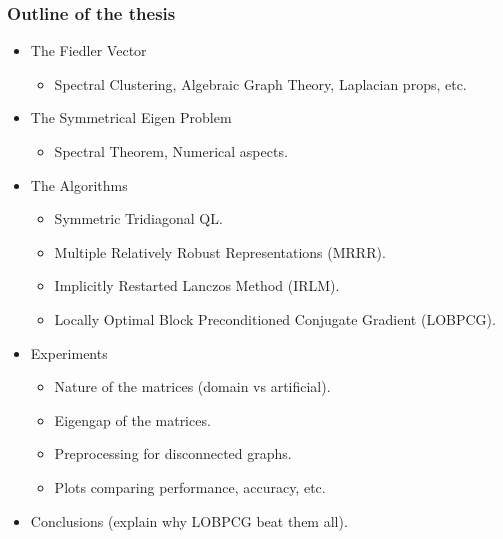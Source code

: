 \begin{frame}
  \frametitle{Outline of the thesis}
  \begin{itemize}
  \item The Fiedler Vector
    \begin{itemize}
    \item Spectral Clustering, Algebraic Graph Theory, Laplacian props, etc.
    \end{itemize}    
  \item The Symmetrical Eigen Problem
    \begin{itemize}
    \item Spectral Theorem, Numerical aspects.
    \end{itemize}    
  \item The Algorithms
    \begin{itemize}
    \item Symmetric Tridiagonal QL.
    \item Multiple Relatively Robust Representations (MRRR).
    \item Implicitly Restarted Lanczos Method (IRLM).
    \item Locally Optimal Block Preconditioned Conjugate Gradient (LOBPCG).
    \end{itemize}
  \item Experiments
    \begin{itemize}
    \item Nature of the matrices (domain vs artificial).
    \item Eigengap of the matrices.
    \item Preprocessing for disconnected graphs.
    \item Plots comparing performance, accuracy, etc.
    \end{itemize}
  \item Conclusions (explain why LOBPCG beat them all).
  \end{itemize}
\end{frame}
